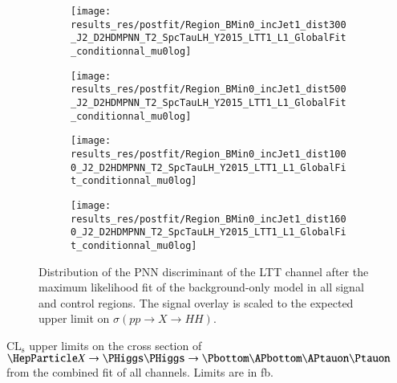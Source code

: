 \begin{figure}[htbp]
  \centering

  \begin{subfigure}{0.495\textwidth}
    \centering

    \texttt{[image: results\_res/postfit/Region\_BMin0\_incJet1\_dist300\_J2\_D2HDMPNN\_T2\_SpcTauLH\_Y2015\_LTT1\_L1\_GlobalFit\_conditionnal\_mu0log]}
  \end{subfigure}\hfill%
  \begin{subfigure}{0.495\textwidth}
    \centering

    \texttt{[image: results\_res/postfit/Region\_BMin0\_incJet1\_dist500\_J2\_D2HDMPNN\_T2\_SpcTauLH\_Y2015\_LTT1\_L1\_GlobalFit\_conditionnal\_mu0log]}
  \end{subfigure}

  \begin{subfigure}{0.495\textwidth}
    \centering

    \texttt{[image: results\_res/postfit/Region\_BMin0\_incJet1\_dist1000\_J2\_D2HDMPNN\_T2\_SpcTauLH\_Y2015\_LTT1\_L1\_GlobalFit\_conditionnal\_mu0log]}
  \end{subfigure}\hfill%
  \begin{subfigure}{0.495\textwidth}
    \centering

    \texttt{[image: results\_res/postfit/Region\_BMin0\_incJet1\_dist1600\_J2\_D2HDMPNN\_T2\_SpcTauLH\_Y2015\_LTT1\_L1\_GlobalFit\_conditionnal\_mu0log]}
  \end{subfigure}

  \caption{Distribution of the PNN discriminant of the \lephad LTT
    channel after the maximum likelihood fit of the background-only
    model in all signal and control regions. The signal overlay is
    scaled to the expected upper limit on $\sigma(pp \to X \to HH)$.}
\end{figure}


\label{app:limit_tables}

\begin{table}[htbp]
  \centering

  
  \caption{$\text{CL}_\text{s}$ upper limits on the cross section of
    $\PX \ra \PHiggs \PHiggs \ra \bbtautau$ from the combined fit of
    all channels. Limits are in fb.}%
  \label{tab:comb_limits_resonant}
\end{table}


